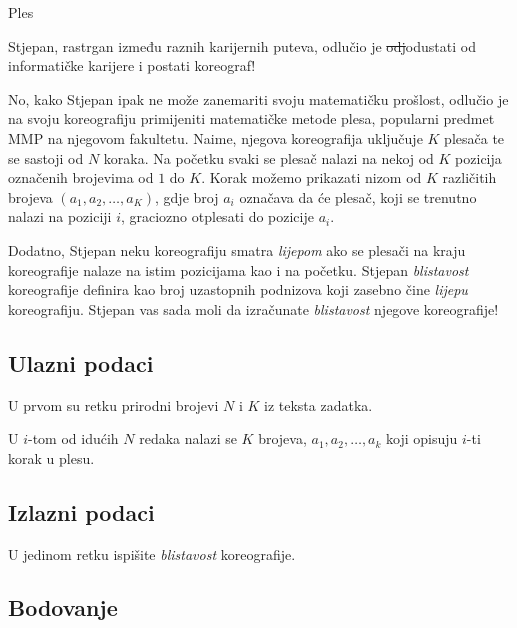 \begin{statement}[
  problempoints=100,
  timelimit=1 sekunda,
  memorylimit=512 MiB,
]{Ples}

Stjepan, rastrgan između raznih karijernih puteva, odlučio je \st{odj}odustati
od informatičke karijere i postati koreograf!

No, kako Stjepan ipak ne može zanemariti svoju matematičku prošlost, odlučio je
na svoju koreografiju primijeniti matematičke metode plesa, popularni predmet
MMP na njegovom fakultetu. Naime, njegova koreografija uključuje $K$ plesača
te se sastoji od $N$ koraka. Na početku svaki se plesač nalazi na nekoj od
$K$ pozicija označenih brojevima od $1$ do $K$. Korak možemo prikazati nizom
od $K$ različitih brojeva $(a_1, a_2, \ldots, a_K)$, gdje broj $a_i$ označava
da će plesač, koji se trenutno nalazi na poziciji $i$, graciozno
otplesati do pozicije $a_i$.

Dodatno, Stjepan neku koreografiju smatra \textit{lijepom} ako se plesači na
kraju koreografije nalaze na istim pozicijama kao i na početku. Stjepan
\textit{blistavost} koreografije definira kao broj uzastopnih podnizova koji
zasebno čine \textit{lijepu} koreografiju. Stjepan vas sada moli da
izračunate \textit{blistavost} njegove koreografije!

\subsection*{Ulazni podaci}

U prvom su retku prirodni brojevi $N$ i $K$ iz teksta zadatka.

U $i$-tom od idućih $N$ redaka nalazi se $K$ brojeva, $a_1, a_2, \ldots,
a_k$ koji opisuju $i$-ti korak u plesu.

\subsection*{Izlazni podaci}

U jedinom retku ispišite \textit{blistavost} koreografije.

\subsection*{Bodovanje}


\end{statement}
